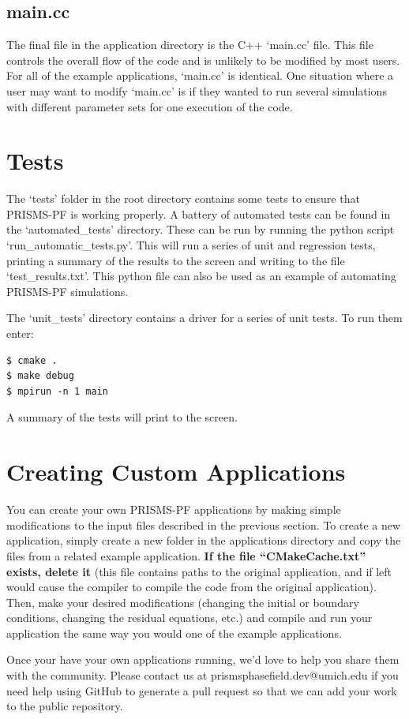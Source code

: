 \documentclass[10pt]{article} %
\begin{document}
\subsection{main.cc}
The final file in the application directory is the C++ `main.cc' file. This file controls the overall flow of the code and is unlikely to be modified by most users. For all of the example applications, `main.cc' is identical. One situation where a user may want to modify `main.cc' is if they wanted to run several simulations with different parameter sets for one execution of the code.

\section{Tests}
The `tests' folder in the root directory contains some tests to ensure that PRISMS-PF is working properly. A battery of automated tests can be found in the `automated\_tests' directory. These can be run by running the python script `run\_automatic\_tests.py'. This will run a series of unit and regression tests, printing a summary of the results to the screen and writing to the file `test\_results.txt'. This python file can also be used as an example of automating PRISMS-PF simulations.

The `unit\_tests' directory contains a driver for a series of unit tests. To run them enter:
\begin{lstlisting}
$ cmake . 
$ make debug 
$ mpirun -n 1 main 
\end{lstlisting}
A summary of the tests will print to the screen.

\section{Creating Custom Applications}
You can create your own PRISMS-PF applications by making simple modifications to the input files described in the previous section. To create a new application, simply create a new folder in the applications directory and copy the files from a related example application. \textbf{If the file ``CMakeCache.txt'' exists, delete it} (this file contains paths to the original application, and if left would cause the compiler to compile the code from the original application). Then, make your desired modifications (changing the initial or boundary conditions, changing the residual equations, etc.) and compile and run your application the same way you would one of the example applications.

Once your have your own applications running, we'd love to help you share them with the community. Please contact us at prismsphasefield.dev@umich.edu if you need help using GitHub to generate a pull request so that we can add your work to the public repository.
\end{document}
